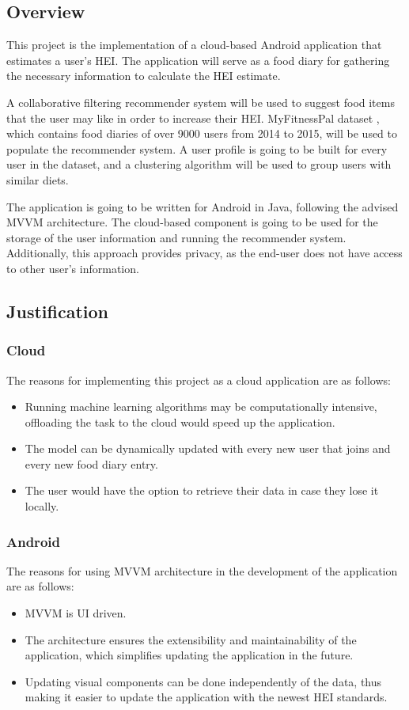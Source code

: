 \documentclass{article}
\begin{document}
\subsection{Overview}
This project is the implementation of a cloud-based Android application that estimates a user's HEI. The application will serve as a food diary for gathering the necessary information to calculate the HEI estimate. 

\bigskip
\noindent A collaborative filtering recommender system will be used to suggest food items that the user may like in order to increase their HEI. MyFitnessPal dataset \cite{diet_success_predictions}, which contains food diaries of over 9000 users from 2014 to 2015, will be used to populate the recommender system. A user profile is going to be built for every user in the dataset, and a clustering algorithm will be used to group users with similar diets. 

\bigskip
\noindent The application is going to be written for Android in Java, following the advised MVVM architecture. The cloud-based component is going to be used for the storage of the user information and running the recommender system. Additionally, this approach provides privacy, as the end-user does not have access to other user's information. 

\newpage
\subsection{Justification}
\subsubsection{Cloud}
The reasons for implementing this project as a cloud application are as follows:
\begin{itemize}
    \item Running machine learning algorithms may be computationally intensive, offloading the task to the cloud would speed up the application.
    \item The model can be dynamically updated with every new user that joins and every new food diary entry.
    \item The user would have the option to retrieve their data in case they lose it locally.
\end{itemize}

\subsubsection{Android}
The reasons for using MVVM architecture in the development of the application are as follows:
\begin{itemize}
    \item MVVM is UI driven. 
    \item The architecture ensures the extensibility and maintainability of the application, which simplifies updating the application in the future.
    \item Updating visual components can be done independently of the data, thus making it easier to update the application with the newest HEI standards. 
\end{itemize}
\end{document}
